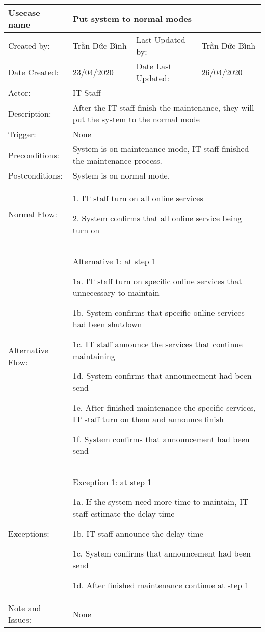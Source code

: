 \begin{center}
\begin{longtable}{|p{3cm}|p{4cm}|p{3cm}|p{4cm}|}
\hline
Usecase name & \multicolumn{3}{p{11cm}|}{
Put system to normal modes
}\\
\hline
Created by: & Trần Đức Bình & Last Updated by: & Trần Đức Bình\\
\hline
Date Created: & 23/04/2020 & Date Last Updated: & 26/04/2020\\
\hline
Actor: & \multicolumn{3}{p{11cm}|}{
IT Staff
}\\
\hline
Description: & \multicolumn{3}{p{11cm}|}{
After the IT staff finish the maintenance, they will put the system to the normal mode
}\\
\hline
Trigger: & \multicolumn{3}{p{11cm}|}{
None
}\\
\hline
Preconditions: & \multicolumn{3}{p{11cm}|}{
System is on maintenance mode, IT staff finished the maintenance process.
}\\
\hline
Postconditions: & \multicolumn{3}{p{11cm}|}{
System is on normal mode.
}\\
\hline
Normal Flow: & \multicolumn{3}{p{11cm}|}{
1. IT staff turn on all online services

2. System confirms that all online service being turn on 
}\\
\hline
Alternative Flow: & \multicolumn{3}{p{11cm}|}{
Alternative 1: at step 1

1a. IT staff turn on specific online services that unnecessary to maintain

1b. System confirms that specific online services had been shutdown

1c. IT staff announce the services that continue maintaining

1d. System confirms that announcement had been send

1e. After finished maintenance the specific services, IT staff turn on them and announce finish

1f. System confirms that announcement had been send
}\\
\hline
Exceptions: & \multicolumn{3}{p{11cm}|}{
Exception 1: at step 1

1a. If the system need more time to maintain, IT staff estimate the delay time

1b. IT staff announce the delay time

1c. System confirms that announcement had been send

1d. After finished maintenance continue at step 1
}\\
\hline
Note and Issues: & \multicolumn{3}{p{11cm}|}{
None
}\\
\hline
\end{longtable}
\end{center}
